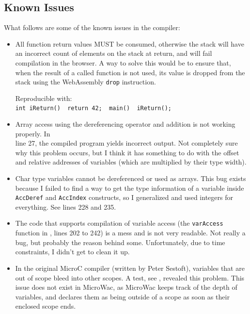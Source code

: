 \documentclass[a4paper]{article}
\begin{document}
\subsection{Known Issues}
\label{sec:testing:known-issues}
What follows are some of the known issues in the compiler:
\begin{itemize}
	\item All function return values MUST be consumed, otherwise the stack will have an incorrect count of elements on the stack at return, and will fail compilation in the browser. A way to solve this would be to ensure that, when the result of a called function is not used, its value is dropped from the stack using the WebAssembly \texttt{drop} instruction.

	Reproducible with:\\
	\texttt{int iReturn() { return 42; } main() { iReturn(); }}

	\item Array access using the dereferencing operator and addition is not working properly. In\\ line 27, the compiled program yields incorrect output. Not completely sure why this problem occurs, but I think it has something to do with the offset and relative addresses of variables (which are multiplied by their type width).

	\item Char type variables cannot be dereferenced or used as arrays. This bug exists because I failed to find a way to get the type information of a variable inside \texttt{AccDeref} and \texttt{AccIndex} constructs, so I generalized and used integers for everything. See  lines 228 and 235.

	\item The code that supports compilation of variable access (the \texttt{varAccess} function in , lines 202 to 242) is a mess and is not very readable. Not really a bug, but probably the reason behind some.  Unfortunately, due to time constraints, I didn't get to clean it up.

	\item In the original MicroC compiler (written by Peter Sestoft), variables that are out of scope bleed into other scopes. A test, see , revealed this problem. This issue does not exist in MicroWac, as MicroWac keeps track of the depth of variables, and declares them as being outside of a scope as soon as their enclosed scope ends.
\end{itemize}
\end{document}
